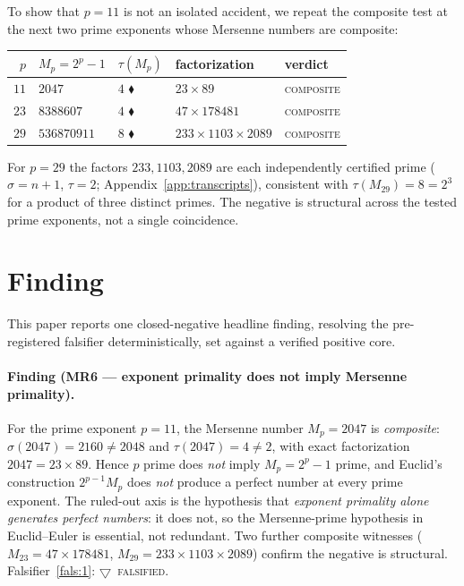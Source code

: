 \documentclass[11pt,a4paper]{article}
\newcommand{\tierF}{\textcolor{blue!60!black}{$\blacklozenge$}}   %
\newcommand{\tierX}{\textcolor{red!70!black}{$\bigtriangledown$}}  %
\newcommand{\sig}{\sigma}
\newcommand{\Mp}{M_p}
\theoremstyle{definition}
\begin{document}
To show that $p=11$ is not an isolated accident, we repeat the composite test at
the next two prime exponents whose Mersenne numbers are composite:
\begin{center}
\begin{tabular}{rllll}
\toprule
$p$ & $\Mp = 2^p-1$ & $\tau(\Mp)$ & factorization & verdict \\
\midrule
$11$ & $2047$       & $4$ \tierF & $23\times 89$               & \textsc{composite} \\
$23$ & $8388607$    & $4$ \tierF & $47\times 178481$           & \textsc{composite} \\
$29$ & $536870911$  & $8$ \tierF & $233\times 1103\times 2089$ & \textsc{composite} \\
\bottomrule
\end{tabular}
\end{center}
\noindent
For $p=29$ the factors $233,1103,2089$ are each independently certified prime
($\sig=n+1$, $\tau=2$; Appendix~\ref{app:transcripts}), consistent with
$\tau(M_{29})=8 = 2^3$ for a product of three distinct primes. The negative is
structural across the tested prime exponents, not a single coincidence.

\section{Finding}
\label{sec:finding}

This paper reports one closed-negative headline finding, resolving the
pre-registered falsifier deterministically, set against a verified positive core.

\paragraph{Finding (MR6 --- exponent primality does not imply Mersenne primality).}
For the prime exponent $p=11$, the Mersenne number $\Mp = 2047$ is
\emph{composite}: $\sig(2047)=2160\neq 2048$ and $\tau(2047)=4\neq 2$, with exact
factorization $2047 = 23\times 89$. Hence $p$ prime does \emph{not} imply
$\Mp = 2^p-1$ prime, and Euclid's construction $2^{p-1}\Mp$ does \emph{not}
produce a perfect number at every prime exponent. The ruled-out axis is the
hypothesis that \emph{exponent primality alone generates perfect numbers}: it
does not, so the Mersenne-prime hypothesis in Euclid--Euler is essential, not
redundant. Two further composite witnesses ($M_{23}=47\times 178481$,
$M_{29}=233\times 1103\times 2089$) confirm the negative is structural.
Falsifier~\ref{fals:1}: \tierX\ \textsc{falsified}.
\end{document}
